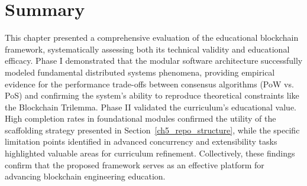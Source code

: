 \section{Summary} \label{ch6_summary}
This chapter presented a comprehensive evaluation of the educational blockchain framework, systematically assessing both its technical validity and educational efficacy. Phase I demonstrated that the modular software architecture successfully modeled fundamental distributed systems phenomena, providing empirical evidence for the performance trade-offs between consensus algorithms (PoW vs. PoS) and confirming the system's ability to reproduce theoretical constraints like the Blockchain Trilemma. Phase II validated the curriculum's educational value. High completion rates in foundational modules confirmed the utility of the scaffolding strategy presented in Section~\ref{ch5_repo_structure}, while the specific limitation points identified in advanced concurrency and extensibility tasks highlighted valuable areas for curriculum refinement. Collectively, these findings confirm that the proposed framework serves as an effective platform for advancing blockchain engineering education.